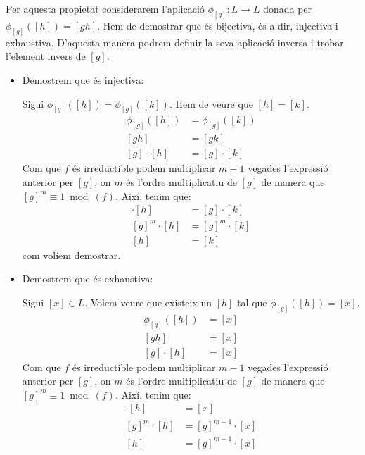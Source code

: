 \documentclass[11pt,a4paper]{article}
\begin{document}
\begin{enumerate}
\begin{enumerate}
\begin{itemize}
            Per aquesta propietat considerarem l'aplicació $\phi_{[g]}:L\longrightarrow L$ donada per $\phi_{[g]}([h])=[gh]$. Hem de demostrar que és bijectiva, és a dir, injectiva i exhaustiva. D'aquesta manera podrem definir la seva aplicació inversa i trobar l'element invers de $[g]$.
            \begin{itemize}
                \item Demostrem que és injectiva:\par
                Sigui $\phi_{[g]}([h])=\phi_{[g]}([k])$. Hem de veure que $[h]=[k]$.
                \begin{align*}
                    \phi_{[g]}([h])&=\phi_{[g]}([k])\\
                    [gh]&=[gk]\\
                    [g]\cdot[h]&=[g]\cdot[k]
                \end{align*}
                Com que $f$ és irreductible podem multiplicar $m-1$ vegades l'expressió anterior per $[g]$, on $m$ és l'ordre multiplicatiu de $[g]$ de manera que $[g]^m\equiv 1\bmod (f)$. Així, tenim que:
                \begin{align*}
                    [g]\cdot[h]&=[g]\cdot[k]\\
                    [g]^m\cdot[h]&=[g]^m\cdot[k]\\
                    [h]&=[k]
                \end{align*}
                com volíem demostrar.
                \item Demostrem que és exhaustiva:\par
                Sigui $[x]\in L$. Volem veure que existeix un $[h]$ tal que $\phi_{[g]}([h])=[x]$.
                \begin{align*}
                    \phi_{[g]}([h])&=[x]\\
                    [gh]&=[x]\\
                    [g]\cdot[h]&=[x]
                \end{align*}
                Com que $f$ és irreductible podem multiplicar $m-1$ vegades l'expressió anterior per $[g]$, on $m$ és l'ordre multiplicatiu de $[g]$ de manera que $[g]^m\equiv 1\bmod (f)$. Així, tenim que:
                \begin{align*}
                    [g]\cdot[h]&=[x]\\
                    [g]^m\cdot[h]&=[g]^{m-1}\cdot[x]\\
                    [h]&=[g]^{m-1}\cdot[x]
                \end{align*}

\end{itemize}
\end{itemize}
\end{enumerate}
\end{enumerate}
\end{document}
